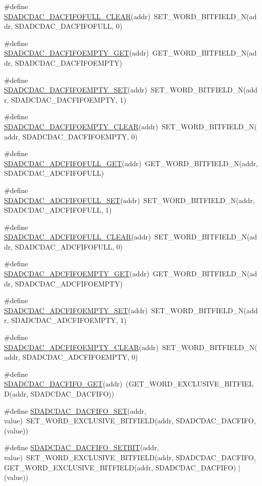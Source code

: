 \begin{DoxyCompactItemize}
\#define \hyperlink{a00568_a9e006a66d1599d2d76c268ac9b5ffa5e}{SDADCDAC\_\-DACFIFOFULL\_\-CLEAR}(addr)~SET\_\-WORD\_\-BITFIELD\_\-N(addr, SDADCDAC\_\-DACFIFOFULL, 0)
\item 
\#define \hyperlink{a00568_a253e3324cd0f1aa8dde90958bb900b4c}{SDADCDAC\_\-DACFIFOEMPTY\_\-GET}(addr)~GET\_\-WORD\_\-BITFIELD\_\-N(addr, SDADCDAC\_\-DACFIFOEMPTY)
\item 
\#define \hyperlink{a00568_ac2de5edb933d7dc36818d3fd9418f522}{SDADCDAC\_\-DACFIFOEMPTY\_\-SET}(addr)~SET\_\-WORD\_\-BITFIELD\_\-N(addr, SDADCDAC\_\-DACFIFOEMPTY, 1)
\item 
\#define \hyperlink{a00568_a6c60ee25a41ead26c356868a277c5d16}{SDADCDAC\_\-DACFIFOEMPTY\_\-CLEAR}(addr)~SET\_\-WORD\_\-BITFIELD\_\-N(addr, SDADCDAC\_\-DACFIFOEMPTY, 0)
\item 
\#define \hyperlink{a00568_aa886cd0b2c8beeff09d0708e78c891e4}{SDADCDAC\_\-ADCFIFOFULL\_\-GET}(addr)~GET\_\-WORD\_\-BITFIELD\_\-N(addr, SDADCDAC\_\-ADCFIFOFULL)
\item 
\#define \hyperlink{a00568_a728b1dc126b612d7e5bfecb4e3aee469}{SDADCDAC\_\-ADCFIFOFULL\_\-SET}(addr)~SET\_\-WORD\_\-BITFIELD\_\-N(addr, SDADCDAC\_\-ADCFIFOFULL, 1)
\item 
\#define \hyperlink{a00568_a1206765f3650fffe2d0dbb969b8f191d}{SDADCDAC\_\-ADCFIFOFULL\_\-CLEAR}(addr)~SET\_\-WORD\_\-BITFIELD\_\-N(addr, SDADCDAC\_\-ADCFIFOFULL, 0)
\item 
\#define \hyperlink{a00568_afbf7c01745f8ea849545b6a2fc712587}{SDADCDAC\_\-ADCFIFOEMPTY\_\-GET}(addr)~GET\_\-WORD\_\-BITFIELD\_\-N(addr, SDADCDAC\_\-ADCFIFOEMPTY)
\item 
\#define \hyperlink{a00568_ae0b0600b387244caead0b11097fad23a}{SDADCDAC\_\-ADCFIFOEMPTY\_\-SET}(addr)~SET\_\-WORD\_\-BITFIELD\_\-N(addr, SDADCDAC\_\-ADCFIFOEMPTY, 1)
\item 
\#define \hyperlink{a00568_a2b061714685907f24baa4638e7c4c276}{SDADCDAC\_\-ADCFIFOEMPTY\_\-CLEAR}(addr)~SET\_\-WORD\_\-BITFIELD\_\-N(addr, SDADCDAC\_\-ADCFIFOEMPTY, 0)
\item 
\#define \hyperlink{a00568_a967e0a64f88488518f7e69f8baf9aa28}{SDADCDAC\_\-DACFIFO\_\-GET}(addr)~(GET\_\-WORD\_\-EXCLUSIVE\_\-BITFIELD(addr, SDADCDAC\_\-DACFIFO))
\item 
\#define \hyperlink{a00568_a3291acdb8bd76b487cf704555bea5289}{SDADCDAC\_\-DACFIFO\_\-SET}(addr, value)~SET\_\-WORD\_\-EXCLUSIVE\_\-BITFIELD(addr, SDADCDAC\_\-DACFIFO, (value))
\item 
\#define \hyperlink{a00568_a3198c2d5be5f44277a1b94b67711a83d}{SDADCDAC\_\-DACFIFO\_\-SETBIT}(addr, value)~SET\_\-WORD\_\-EXCLUSIVE\_\-BITFIELD(addr, SDADCDAC\_\-DACFIFO, GET\_\-WORD\_\-EXCLUSIVE\_\-BITFIELD(addr, SDADCDAC\_\-DACFIFO) $|$ (value))

\end{DoxyCompactItemize}
